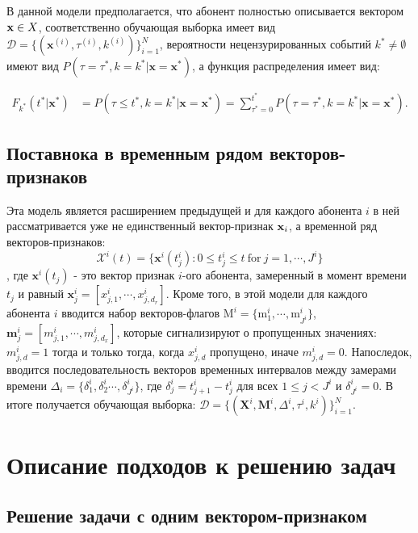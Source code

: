 \documentclass{article}
\begin{document}
В данной модели предполагается, что абонент полностью описывается вектором $\bold{x} \in X$, соответственно обучающая выборка имеет вид $\mathcal{D}=\{(\mathbf{x}^{(i)},\tau^{(i)},k^{(i)})\}_{i=1}^N$, вероятности нецензурированных событий $k^* \neq \emptyset $ имеют вид $P(\tau=\tau^*,k=k^*|\mathbf{x}=\mathbf{x}^*)$, а функция распределения имеет вид:

\begin{align}
	F_{k^*}(t^*|\mathbf{x}^*) &= P(\tau\leq t^*,k=k^*|\mathbf{x}=\mathbf{x}^*) 
	= \sum_{\tau^*=0}^{t^*} P(\tau=\tau^*,k=k^*|\mathbf{x}=\mathbf{x}^*).
\end{align}




\subsection{Поставнока в временным рядом векторов-признаков}

Эта модель является расширением предыдущей и для каждого абонента $i$ в ней рассматривается уже не единственный вектор-признак $\bold{x}_i$, а временной ряд векторов-признаков: 
$$\mathcal{X}^i(t)=\{\mathbf{x}^i(t_j^i):0\leq t_j^i\leq t\mathrm{~for~}j=1,\cdots,J^i\}$$, где $\mathbf{x}^i(t_j)$ - это вектор признак $i$-ого абонента, замеренный в момент времени $t_j$ и равный $\mathbf{x}_j^i=[x_{j,1}^{i},\cdots,x_{j,d_{r}}^{i}]$. Кроме того, в этой модели для каждого абонента $i$ вводится набор векторов-флагов $\mathrm{M}^i=\{\mathrm{m}_1^i,\cdots,\mathrm{m}_{J^i}^i\}$, $\mathbf{m}_j^i=[m_{j,1}^i,\cdots,m_{j,d_x}^i]$, которые сигнализируют о пропущенных значениях: $m_{j,d}^{i}=1$ тогда и только тогда, когда $x_{j,d}^{i}$ пропущено, иначе $m_{j,d}^{i}=0$. Напоследок, вводится последовательность векторов временных интервалов между замерами времени $\Delta_i = \{\delta_{1}^{i},\delta_{2}^{i}\cdots,\delta_{J^{i}}^{i}\}$, где $\delta_{j}^{i}=t_{j+1}^{i}-t_{j}^{i}$ для всех $1\leq j<J^{i}$ и $\delta_{J^i}^i=0$. В итоге получается обучающая выборка: $\mathcal{D}=\{(\mathbf{X}^{i},\mathbf{M}^{i},\Delta^{i},\tau^{i},k^{i})\}_{i=1}^{N}$.



\section{Описание подходов к решению задач}

\subsection{Решение задачи с одним вектором-признаком}
\end{document}
